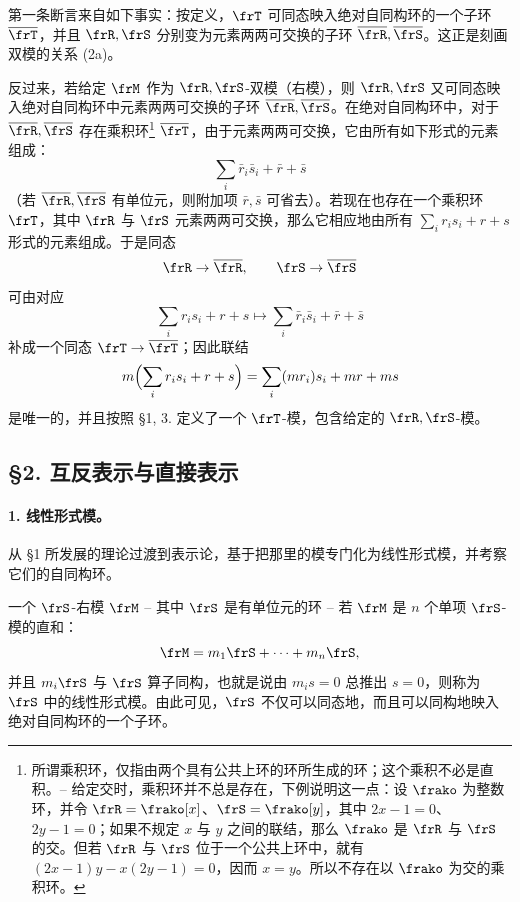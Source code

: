 第一条断言来自如下事实：按定义，\(\frT\) 可同态映入绝对自同构环的一个子环 \(\overline{\frT}\)，并且 \(\frR,\frS\) 分别变为元素两两可交换的子环 \(\overline{\frR},\overline{\frS}\)。这正是刻画双模的关系 (2a)。

反过来，若给定 \(\frM\) 作为 \(\frR,\frS\)-双模（右模），则 \(\frR,\frS\) 又可同态映入绝对自同构环中元素两两可交换的子环 \(\overline{\frR},\overline{\frS}\)。在绝对自同构环中，对于 \(\overline{\frR},\overline{\frS}\) 存在乘积环\footnote{所谓乘积环，仅指由两个具有公共上环的环所生成的环；这个乘积不必是直积。-- 给定交时，乘积环并不总是存在，下例说明这一点：设 \(\frako\) 为整数环，并令 \(\frR=\frako[x]\)、\(\frS=\frako[y]\)，其中 \(2x-1=0\)、\(2y-1=0\)；如果不规定 \(x\) 与 \(y\) 之间的联结，那么 \(\frako\) 是 \(\frR\) 与 \(\frS\) 的交。但若 \(\frR\) 与 \(\frS\) 位于一个公共上环中，就有 \((2x-1)y-x(2y-1)=0\)，因而 \(x=y\)。所以不存在以 \(\frako\) 为交的乘积环。} \(\overline{\frT}\)，由于元素两两可交换，它由所有如下形式的元素组成：
\[
        \sum_i \bar r_i\bar s_i+\bar r+\bar s
\]
（若 \(\overline{\frR},\overline{\frS}\) 有单位元，则附加项 \(\bar r,\bar s\) 可省去）。若现在也存在一个乘积环 \(\frT\)，其中 \(\frR\) 与 \(\frS\) 元素两两可交换，那么它相应地由所有 \(\sum_i r_i s_i+r+s\) 形式的元素组成。于是同态
\[
        \frR\to\overline{\frR},\qquad \frS\to\overline{\frS}
\]
可由对应
\[
        \sum_i r_i s_i+r+s
        \longmapsto
        \sum_i \bar r_i\bar s_i+\bar r+\bar s
\]
补成一个同态 \(\frT\to\overline{\frT}\)；因此联结
\[
        m\Bigl(\sum_i r_i s_i+r+s\Bigr)
        =\sum_i (m r_i)s_i+m r+m s
\]
是唯一的，并且按照 §1, 3. 定义了一个 \(\frT\)-模，包含给定的 \(\frR,\frS\)-模。

\subsection*{§2. 互反表示与直接表示}

\paragraph{1. 线性形式模。}
从 §1 所发展的理论过渡到表示论，基于把那里的模专门化为线性形式模，并考察它们的自同构环。

一个 \(\frS\)-右模 \(\frM\) -- 其中 \(\frS\) 是有单位元的环 -- 若 \(\frM\) 是 \(n\) 个单项 \(\frS\)-模的直和：
\[
        \frM=m_1\frS+\cdots+m_n\frS,
\]
并且 \(m_i\frS\) 与 \(\frS\) 算子同构，也就是说由 \(m_i s=0\) 总推出 \(s=0\)，则称为 \(\frS\) 中的线性形式模。由此可见，\(\frS\) 不仅可以同态地，而且可以同构地映入绝对自同构环的一个子环。

